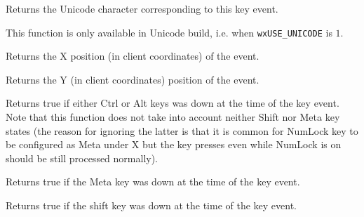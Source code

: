 \label{wxkeyeventgetunicodekey}


Returns the Unicode character corresponding to this key event.

This function is only available in Unicode build, i.e. when
\texttt{wxUSE\_UNICODE} is $1$.


\label{wxkeyeventgetx}


Returns the X position (in client coordinates) of the event.


\label{wxkeyeventgety}


Returns the Y (in client coordinates) position of the event.


\label{wxkeyeventhasmodifiers}


Returns true if either {\sc Ctrl} or {\sc Alt} keys was down
at the time of the key event. Note that this function does not take into
account neither {\sc Shift} nor {\sc Meta} key states (the reason for ignoring
the latter is that it is common for {\sc NumLock} key to be configured as
{\sc Meta} under X but the key presses even while {\sc NumLock} is on should
be still processed normally).


\label{wxkeyeventmetadown}


Returns true if the Meta key was down at the time of the key event.


\label{wxkeyeventshiftdown}


Returns true if the shift key was down at the time of the key event.

